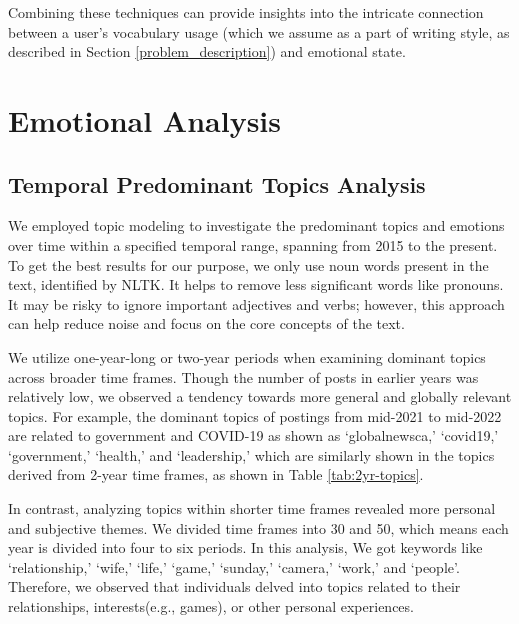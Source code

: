 \documentclass[conference,compsoc]{IEEEtran}
\begin{document}
Combining these techniques can provide insights into the intricate connection between a user's vocabulary usage (which we assume as a part of writing style, as described in Section \ref{problem_description}) and emotional state.

\section{Emotional Analysis} \label{analysis}

\subsection{Temporal Predominant Topics Analysis}
We employed topic modeling to investigate the predominant topics and emotions over time within a specified temporal range, spanning from 2015 to the present. To get the best results for our purpose, we only use noun words present in the text, identified by NLTK. It helps to remove less significant words like pronouns. It may be risky to ignore important adjectives and verbs; however, this approach can help reduce noise and focus on the core concepts of the text.

We utilize one-year-long or two-year periods when examining dominant topics across broader time frames. Though the number of posts in earlier years was relatively low, we observed a tendency towards more general and globally relevant topics. For example, the dominant topics of postings from mid-2021 to mid-2022 are related to government and COVID-19 as shown as `globalnewsca,' `covid19,' `government,' `health,' and `leadership,' which are similarly shown in the topics derived from 2-year time frames, as shown in Table \ref{tab:2yr-topics}. 

In contrast, analyzing topics within shorter time frames revealed more personal and subjective themes. We divided time frames into 30 and 50, which means each year is divided into four to six periods. In this analysis, We got keywords like `relationship,' `wife,' `life,' `game,' `sunday,' `camera,' `work,' and `people'. Therefore, we observed that individuals delved into topics related to their relationships, interests(e.g., games), or other personal experiences.
\end{document}
